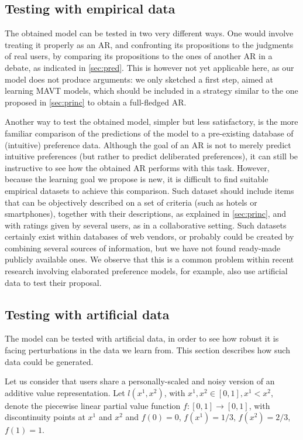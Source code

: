 \documentclass[version=3.21, pagesize, twoside=off, bibliography=totoc, DIV=calc, fontsize=12pt, a4paper, french, english]{scrartcl}
\begin{document}
\subsection{Testing with empirical data}
The obtained model can be tested in two very different ways. One would involve treating it properly as an \ac{AR}, and confronting its propositions to the judgments of real users, by comparing its propositions to the ones of another \ac{AR} in a debate, as indicated in \cref{sec:pred}. This is however not yet applicable here, as our model does not produce arguments: we only sketched a first step, aimed at learning \ac{MAVT} models, which should be included in a strategy similar to the one proposed in \cref{sec:princ} to obtain a full-fledged \ac{AR}. 

Another way to test the obtained model, simpler but less satisfactory, is the more familiar comparison of the predictions of the model to a pre-existing database of (intuitive) preference data. Although the goal of an \ac{AR} is not to merely predict intuitive preferences (but rather to predict deliberated preferences), it can still be instructive to see how the obtained \ac{AR} performs with this task.
However, because the learning goal we propose is new, it is difficult to find suitable empirical datasets to achieve this comparison. Such dataset should include items that can be objectively described on a set of criteria (such as hotels or smartphones), together with their descriptions, as explained in \cref{sec:princ}, and with ratings given by several users, as in a collaborative setting. Such datasets certainly exist within databases of web vendors, or probably could be created by combining several sources of information, but we have not found ready-made publicly available ones. We observe that this is a common problem within recent research involving elaborated preference models, for example, \citet{teso_constructive_2016} also use artificial data to test their proposal.

\subsection{Testing with artificial data}
The model can be tested with artificial data, in order to see how robust it is facing perturbations in the data we learn from. This section describes how such data could be generated.

Let us consider that users share a personally-scaled and noisy version of an additive value representation. 
Let $l(x^1, x^2)$, with $x^1, x^2 \in [0, 1], x^1 < x^2$, denote the piecewise linear partial value function $f: [0, 1] → [0, 1]$, with discontinuity points at $x^1$ and $x^2$ and $f(0) = 0$, $f(x^1) = 1/3$, $f(x^2) = 2/3$, $f(1) = 1$.
\end{document}

